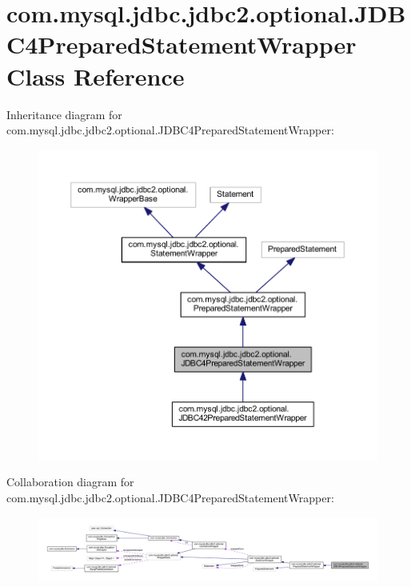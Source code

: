 \hypertarget{classcom_1_1mysql_1_1jdbc_1_1jdbc2_1_1optional_1_1_j_d_b_c4_prepared_statement_wrapper}{}\section{com.\+mysql.\+jdbc.\+jdbc2.\+optional.\+J\+D\+B\+C4\+Prepared\+Statement\+Wrapper Class Reference}
\label{classcom_1_1mysql_1_1jdbc_1_1jdbc2_1_1optional_1_1_j_d_b_c4_prepared_statement_wrapper}


Inheritance diagram for com.\+mysql.\+jdbc.\+jdbc2.\+optional.\+J\+D\+B\+C4\+Prepared\+Statement\+Wrapper\+:
\nopagebreak
\begin{figure}[H]
\begin{center}
\leavevmode
\includegraphics[width=350pt]{classcom_1_1mysql_1_1jdbc_1_1jdbc2_1_1optional_1_1_j_d_b_c4_prepared_statement_wrapper__inherit__graph}
\end{center}
\end{figure}


Collaboration diagram for com.\+mysql.\+jdbc.\+jdbc2.\+optional.\+J\+D\+B\+C4\+Prepared\+Statement\+Wrapper\+:
\nopagebreak
\begin{figure}[H]
\begin{center}
\leavevmode
\includegraphics[width=350pt]{classcom_1_1mysql_1_1jdbc_1_1jdbc2_1_1optional_1_1_j_d_b_c4_prepared_statement_wrapper__coll__graph}
\end{center}
\end{figure}
